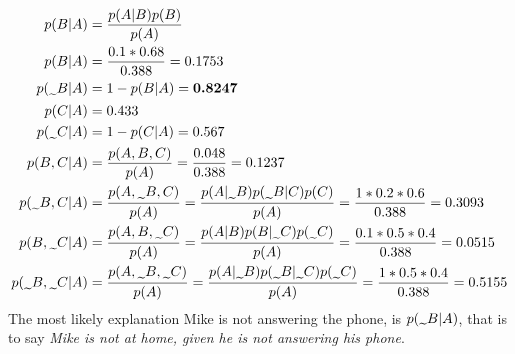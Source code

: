 \begin{align*}
p(B|A) & = \frac{p(A|B)p(B)}{p(A)} \\
p(B|A) & = \frac{0.1*0.68}{0.388} = 0.1753\\
p(\midtilde B|A) & = 1 - p(B|A) = \textbf{0.8247} \\
p(C|A) & = 0.433 \\
p(\midtilde C|A) & = 1 - p(C|A) = 0.567 \\
p(B,C|A) & = \frac{p(A,B,C)}{p(A)} = \frac{0.048}{0.388} = 0.1237 \\
p(\midtilde B, C|A) & = \frac{p(A,\midtilde B,C)}{p(A)}  = \frac{p(A|\midtilde B)p(\midtilde B|C) p(C)}{p(A)} = \frac{1*0.2*0.6}{0.388} = 0.3093\\
p(B, \midtilde C|A) & = \frac{p(A,B,\midtilde C)}{p(A)}  = \frac{p(A|B)p(B|\midtilde C) p(\midtilde C)}{p(A)} = \frac{0.1*0.5*0.4}{0.388} = 0.0515 \\
p(\midtilde B, \midtilde C | A) & = \frac{p(A,\midtilde B,\midtilde C)}{p(A)}  = \frac{p(A|\midtilde B)p(\midtilde B|\midtilde C) p(\midtilde C)}{p(A)} = \frac{1*0.5*0.4}{0.388} = 0.5155 \\
\end{align*}
The most likely explanation Mike is not answering the phone, is $p(\midtilde B|A)$, that is to say \textit{Mike is not at home, given he is not answering his phone}.


